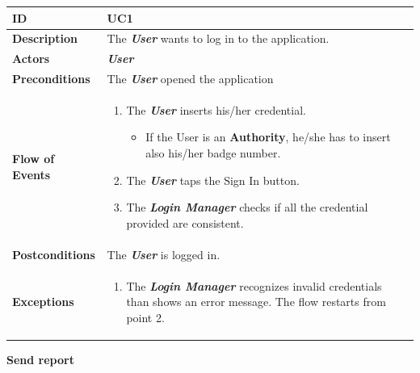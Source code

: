 \documentclass{report}
\begin{document}
\begin{tabularx}{\linewidth}{| l | X |}
	\hline
	\textbf{ID} & UC1\\
	
	\hline
	\textbf{Description} & The \textbf{\textit{User}} wants to log in to the application.\\
	
	\hline
	\textbf{Actors} & \textbf{\textit{User}}\\
	
	\hline
	\textbf{Preconditions} & The \textbf{\textit{User}} opened the application\\
	
	\hline
	\textbf{Flow of Events} & \parbox{0.7\textwidth}{\begin{enumerate}
			\item The \textbf{\textit{User}} inserts his/her credential.
			\begin{itemize}
			\item If the User is an \textbf{Authority}, he/she has to insert also his/her badge number.
			\end{itemize}
			\item The \textbf{\textit{User}} taps the Sign In button.			
			\item The \textbf{\textit{Login Manager}} checks if all the credential provided are consistent.
			
			
	\end{enumerate}}\\
	
	\hline
	\textbf{Postconditions} & The \textbf{\textit{User}} is logged in.\\
	
	\hline
	\textbf{Exceptions} & \parbox{0.7\textwidth}{ \begin{enumerate}
			\item The \textbf{\textit{Login Manager}} recognizes invalid credentials than shows an error message. The flow restarts from point 2. 
		\end{enumerate}}\\
	
	\hline
\end{tabularx}
\begin{center}
	\textbf{Send report}
\end{center}
\end{document}
